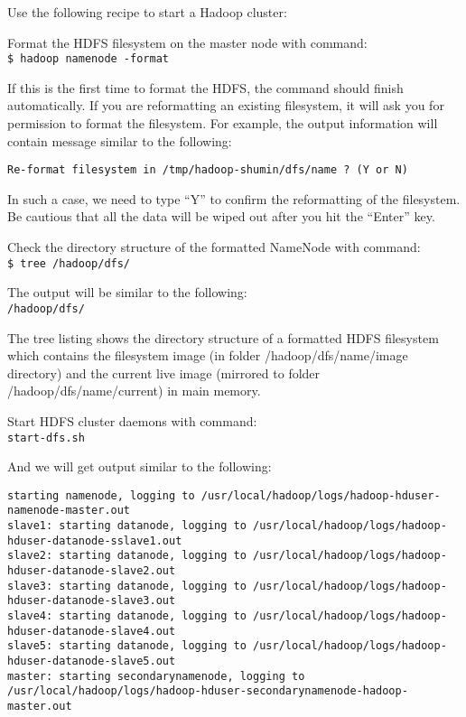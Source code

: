 Use the following recipe to start a Hadoop cluster:

Format the HDFS filesystem on the master node with command: \\
\verb|$ hadoop namenode -format|

If this is the first time to format the HDFS, the command should finish automatically. If you are reformatting an existing filesystem, it will ask you for permission to format the filesystem. For example, the output information will contain message similar to the following:

\verb|Re-format filesystem in /tmp/hadoop-shumin/dfs/name ? (Y or N)|

In such a case, we need to type ``Y'' to confirm the reformatting of the filesystem. Be cautious that all the data will be wiped out after you hit the ``Enter'' key.

Check the directory structure of the formatted NameNode with command: \\
\verb|$ tree /hadoop/dfs/|

The output will be similar to the following: \\
\verb|/hadoop/dfs/|


The tree listing shows the directory structure of a formatted HDFS filesystem which contains the filesystem image (in folder /hadoop/dfs/name/image directory) and the current live image (mirrored to folder /hadoop/dfs/name/current) in main memory.

Start HDFS cluster daemons with command: \\
\verb|start-dfs.sh|

And we will get output similar to the following:
\begin{verbatim}
starting namenode, logging to /usr/local/hadoop/logs/hadoop-hduser-namenode-master.out
slave1: starting datanode, logging to /usr/local/hadoop/logs/hadoop-hduser-datanode-sslave1.out
slave2: starting datanode, logging to /usr/local/hadoop/logs/hadoop-hduser-datanode-slave2.out
slave3: starting datanode, logging to /usr/local/hadoop/logs/hadoop-hduser-datanode-slave3.out
slave4: starting datanode, logging to /usr/local/hadoop/logs/hadoop-hduser-datanode-slave4.out
slave5: starting datanode, logging to /usr/local/hadoop/logs/hadoop-hduser-datanode-slave5.out
master: starting secondarynamenode, logging to /usr/local/hadoop/logs/hadoop-hduser-secondarynamenode-hadoop-master.out
\end{verbatim}

